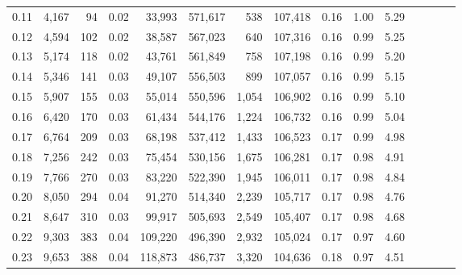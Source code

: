 \begin{tabular}{rrrcrrrrrrrrrrr}
0.11 &   4,167 &     94 &                                       0.02 &   33,993 &  571,617 &      538 &  107,418 &  0.16 &  1.00 &                         5.29 \\
0.12 &   4,594 &    102 &                                       0.02 &   38,587 &  567,023 &      640 &  107,316 &  0.16 &  0.99 &                         5.25 \\
0.13 &   5,174 &    118 &                                       0.02 &   43,761 &  561,849 &      758 &  107,198 &  0.16 &  0.99 &                         5.20 \\
0.14 &   5,346 &    141 &                                       0.03 &   49,107 &  556,503 &      899 &  107,057 &  0.16 &  0.99 &                         5.15 \\
0.15 &   5,907 &    155 &                                       0.03 &   55,014 &  550,596 &    1,054 &  106,902 &  0.16 &  0.99 &                         5.10 \\
0.16 &   6,420 &    170 &                                       0.03 &   61,434 &  544,176 &    1,224 &  106,732 &  0.16 &  0.99 &                         5.04 \\
0.17 &   6,764 &    209 &                                       0.03 &   68,198 &  537,412 &    1,433 &  106,523 &  0.17 &  0.99 &                         4.98 \\
0.18 &   7,256 &    242 &                                       0.03 &   75,454 &  530,156 &    1,675 &  106,281 &  0.17 &  0.98 &                         4.91 \\
0.19 &   7,766 &    270 &                                       0.03 &   83,220 &  522,390 &    1,945 &  106,011 &  0.17 &  0.98 &                         4.84 \\
0.20 &   8,050 &    294 &                                       0.04 &   91,270 &  514,340 &    2,239 &  105,717 &  0.17 &  0.98 &                         4.76 \\
0.21 &   8,647 &    310 &                                       0.03 &   99,917 &  505,693 &    2,549 &  105,407 &  0.17 &  0.98 &                         4.68 \\
0.22 &   9,303 &    383 &                                       0.04 &  109,220 &  496,390 &    2,932 &  105,024 &  0.17 &  0.97 &                         4.60 \\
0.23 &   9,653 &    388 &                                       0.04 &  118,873 &  486,737 &    3,320 &  104,636 &  0.18 &  0.97 &                         4.51 \\

\end{tabular}
